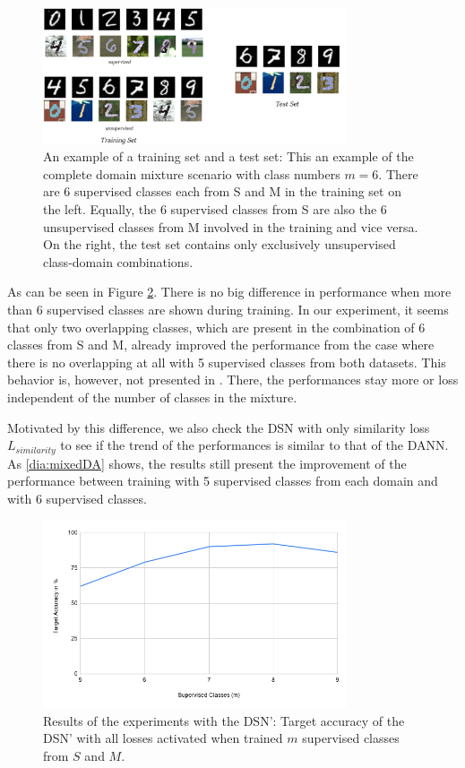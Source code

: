\begin{figure}[tbh]
  \centering
  \includegraphics[width=0.8\textwidth]{abbildungen/mixedDomain.png}
  \caption{An example of a training set and a test set: This an example of the complete domain mixture scenario with class numbers $m = 6$. There are 6 supervised classes each from S and M in the training set on the left. Equally, the 6 supervised classes from S are also the 6 unsupervised classes from M involved in the training and vice versa. On the right, the test set contains only exclusively unsupervised class-domain combinations.}
  \label{pic:mixedDomain}
\end{figure}

As can be seen in Figure \ref{dia:mixedDSN}. There is no big difference in performance when more than 6 supervised classes are shown during training. In our experiment, it seems that only two overlapping classes, which are present in the combination of 6 classes from S and M, already improved the performance from the case where there is no overlapping at all with 5 supervised classes from both datasets. This behavior is, however, not presented in \cite{domainMixture}. There, the performances stay more or loss independent of the number of classes in the mixture.  

Motivated by this difference, we also check the DSN with only similarity loss $L_{similarity}$ to see if the trend of the performances is similar to that of the DANN. As \ref{dia:mixedDA} shows, the results still present the improvement of the performance between training with 5 supervised classes from each domain and with 6 supervised classes. 

\begin{figure}[tbh]
  \centering
  \includegraphics[width=0.8\textwidth]{abbildungen/mixedResults.png}
  \caption{Results of the experiments with the DSN': Target accuracy of the DSN' with all losses activated when trained $m$ supervised classes from $S$ and $M$.}
  \label{dia:mixedDSN}
\end{figure}

